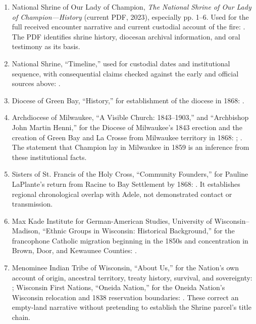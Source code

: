 \begin{enumerate}
  \item National Shrine of Our Lady of Champion, \emph{The National Shrine of Our Lady of Champion---History} (current PDF, 2023), especially pp. 1--6. Used for the full received encounter narrative and current custodial account of the fire: . The PDF identifies shrine history, diocesan archival information, and oral testimony as its basis.
  \item National Shrine, “Timeline,” used for custodial dates and institutional sequence, with consequential claims checked against the early and official sources above: .
  \item Diocese of Green Bay, “History,” for establishment of the diocese in 1868: .
  \item Archdiocese of Milwaukee, “A Visible Church: 1843--1903,” and “Archbishop John Martin Henni,” for the Diocese of Milwaukee's 1843 erection and the creation of Green Bay and La Crosse from Milwaukee territory in 1868: ; . The statement that Champion lay in Milwaukee in 1859 is an inference from these institutional facts.
  \item Sisters of St. Francis of the Holy Cross, “Community Founders,” for Pauline LaPlante's return from Racine to Bay Settlement by 1868: . It establishes regional chronological overlap with Adele, not demonstrated contact or transmission.
  \item Max Kade Institute for German-American Studies, University of Wisconsin--Madison, “Ethnic Groups in Wisconsin: Historical Background,” for the francophone Catholic migration beginning in the 1850s and concentration in Brown, Door, and Kewaunee Counties: .
  \item Menominee Indian Tribe of Wisconsin, “About Us,” for the Nation's own account of origin, ancestral territory, treaty history, survival, and sovereignty: ; Wisconsin First Nations, “Oneida Nation,” for the Oneida Nation's Wisconsin relocation and 1838 reservation boundaries: . These correct an empty-land narrative without pretending to establish the Shrine parcel's title chain.

\end{enumerate}
